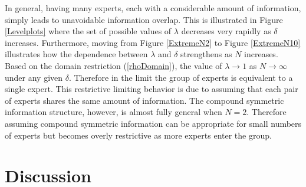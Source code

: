 \documentclass[11pt]{article}
\theoremstyle{definition}
\theoremstyle{definition}
\begin{document}
In general, having many experts, each with a considerable amount of information, simply leads to unavoidable information overlap. This is illustrated in Figure \ref{Levelplots} where the set of possible values of $\lambda$ decreases very rapidly as $\delta$ increases. Furthermore, moving from Figure \ref{ExtremeN2} to Figure \ref{ExtremeN10} illustrates how the dependence between $\lambda$ and $\delta$ strengthens as $N$ increases. Based on the domain restriction (\ref{rhoDomain}), the value of $\lambda \to 1$ as $N \to \infty$ under any given $\delta$. Therefore in the limit the group of experts is equivalent to a single expert. This restrictive limiting behavior is due to assuming that each pair of experts shares the same amount of information. The compound symmetric information structure, however, is almost fully general when $N = 2$. Therefore assuming compound symmetric information can be appropriate for small numbers of experts but becomes overly restrictive as more experts enter the group. 


\section{Discussion}



\end{document}
